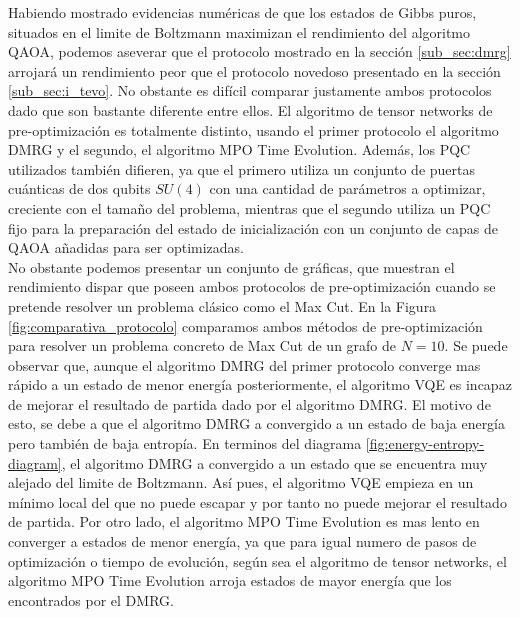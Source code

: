 Habiendo mostrado evidencias numéricas de que los estados de Gibbs puros, situados en el limite de Boltzmann maximizan el rendimiento del algoritmo QAOA, podemos aseverar que el protocolo mostrado en la sección \ref{sub_sec:dmrg} arrojará un rendimiento peor que el protocolo novedoso presentado en la sección \ref{sub_sec:i_tevo}. No obstante es difícil comparar justamente ambos protocolos dado que son bastante diferente entre ellos. El algoritmo de tensor networks de pre-optimización es totalmente distinto, usando el primer protocolo el algoritmo DMRG y el segundo, el algoritmo MPO Time Evolution. Además, los \mbox{PQC} utilizados también difieren, ya que el primero utiliza un conjunto de puertas cuánticas de dos qubits $SU(4)$ con una cantidad de parámetros a optimizar, creciente con el tamaño del problema, mientras que el segundo utiliza un \mbox{PQC} fijo para la preparación del estado de inicialización con un conjunto de capas de QAOA añadidas para ser optimizadas. \\

No obstante podemos presentar un conjunto de gráficas, que muestran el rendimiento dispar que poseen ambos protocolos de pre-optimización cuando se pretende resolver un problema clásico como el Max Cut. En la Figura \ref{fig:comparativa_protocolo} comparamos ambos métodos de pre-optimización para resolver un problema concreto de Max Cut de un grafo de $N=10$. Se puede observar que, aunque el algoritmo DMRG del primer protocolo converge mas rápido a un estado de menor energía posteriormente, el algoritmo VQE es incapaz de  mejorar el resultado de partida dado por el algoritmo DMRG. El motivo de esto, se debe a que el algoritmo DMRG a convergido a un estado de baja energía pero también de baja entropía. En terminos del diagrama \ref{fig:energy-entropy-diagram}, el algoritmo DMRG a convergido a un estado que se encuentra muy alejado del limite de Boltzmann. Así pues, el algoritmo VQE empieza en un mínimo local del que no puede escapar y por tanto no puede mejorar el resultado de partida. Por otro lado, el algoritmo MPO Time Evolution es mas lento en converger a estados de menor energía, ya que para igual numero de pasos de optimización o tiempo de evolución, según sea el algoritmo de tensor networks, el algoritmo MPO Time Evolution arroja estados de mayor energía que los encontrados por el DMRG. 

\newpage

